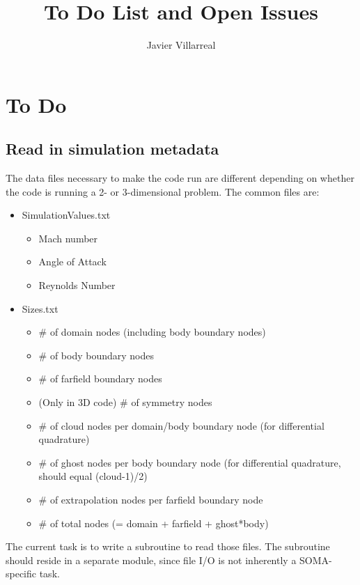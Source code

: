 \documentclass[12pt]{article}
\begin{document}
    \title{To Do List and Open Issues}
    \author{Javier Villarreal}
    \date{}
    \maketitle

    \section*{To Do}
    \subsection*{Read in simulation metadata}
        The data files necessary to make the code run are different depending on whether the code is running a 2- or 3-dimensional problem. The common files are:
        \begin{itemize}
            \item SimulationValues.txt
            \begin{itemize}
                \item Mach number
                \item Angle of Attack
                \item Reynolds Number
            \end{itemize}
            \item Sizes.txt
            \begin{itemize}
                \item \# of domain nodes (including body boundary nodes)
                \item \# of body boundary nodes
                \item \# of farfield boundary nodes
                \item (Only in 3D code) \# of symmetry nodes
                \item \# of cloud nodes per domain/body boundary node (for differential quadrature)
                \item \# of ghost nodes per body boundary node (for differential quadrature, should equal (cloud-1)/2)
                \item \# of extrapolation nodes per farfield boundary node
                \item \# of total nodes (= domain + farfield + ghost*body)
            \end{itemize}
        \end{itemize}
    
    The current task is to write a subroutine to read those files. The subroutine should reside in a separate module, since file I/O is not inherently a SOMA-specific task.
\end{document}
